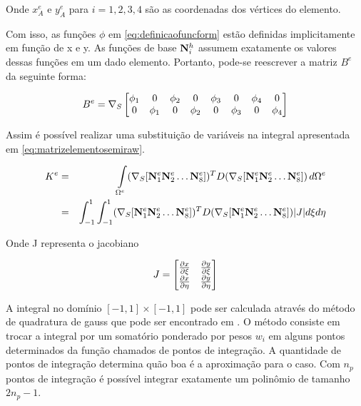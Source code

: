 Onde $x^e_A$ e $y^e_A$ para $i=1,2,3,4$ são as coordenadas dos vértices do elemento.

Com isso, as funções $\phi$ em \eqref{eq:definicaofuncform} estão definidas implicitamente em função de x e y. As funções de base $\basefunctionfine$ assumem exatamente os valores dessas funções em um dado elemento. Portanto, pode-se reescrever a matriz $B^e$ da seguinte forma:


\begin{equation} \label{eq:bephi}
    B^e = \sopnabla \begin{bmatrix}
\phi_1 & 0      & \phi_2 & 0 & \phi_3 & 0 & \phi_4 & 0\\ 
0      & \phi_1 & 0 & \phi_2 & 0 & \phi_3 & 0 & \phi_4
\end{bmatrix}
\end{equation}


Assim é possível realizar uma substituição de variáveis na integral apresentada em \eqref{eq:matrizelementosemiraw}.


\begin{eqnarray}
K^e     & = & \omeeint{ (\sopnabla [\basefunctionelem[1] \basefunctionelem[2] \hdots \basefunctionelem[8] ]) ^T D (\sopnabla [\basefunctionelem[1] \basefunctionelem[2] \hdots \basefunctionelem[8]])}   \\
        & = &  \intbase{(\sopnabla [\basefunctionelem[1] \basefunctionelem[2] \hdots \basefunctionelem[8] ]) ^T D (\sopnabla [\basefunctionelem[1] \basefunctionelem[2] \hdots \basefunctionelem[8]]) |J| } 
\end{eqnarray}


Onde J representa o jacobiano

\begin{equation}
J = \begin{bmatrix}
\dxi[x]   &  \dxi[y]    \\
\deta[x]  &  \deta[y] 
\end{bmatrix}
\label{eq:jacobiano}
\end{equation}


A integral no domínio $[-1, 1] \times [-1,1] $ pode ser calculada através do método de quadratura de gauss que pode ser encontrado em \cite{jacob}. O método consiste em trocar a integral por um somatório ponderado por pesos $w_i$ em alguns pontos determinados da função chamados de pontos de integração. A quantidade de pontos de integração determina quão boa é a aproximação para o caso. Com $n_p$ pontos de integração é possível integrar exatamente um 
polinômio de tamanho $2n_p - 1$. %


